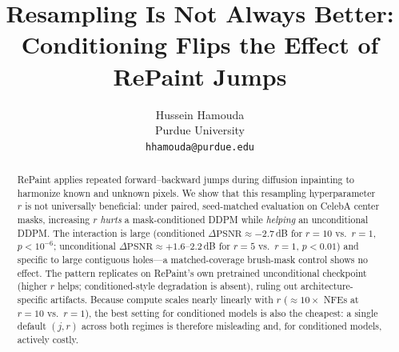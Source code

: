 \documentclass{article}
\title{Resampling Is Not Always Better:\\
Conditioning Flips the Effect of RePaint Jumps}
\author{%
  Hussein Hamouda \\
  Purdue University \\
  \texttt{hhamouda@purdue.edu} \\
}
\begin{document}
\maketitle

\begin{abstract}
RePaint applies repeated forward--backward jumps during diffusion inpainting to harmonize known and unknown pixels.
We show that this resampling hyperparameter $r$ is not universally beneficial:
under paired, seed-matched evaluation on CelebA center masks, increasing $r$ \emph{hurts} a mask-conditioned DDPM while \emph{helping} an unconditional DDPM.
The interaction is large (conditioned $\Delta\mathrm{PSNR}{\approx}{-}2.7$\,dB for $r{=}10$ vs.\ $r{=}1$, $p{<}10^{-6}$; unconditional $\Delta\mathrm{PSNR}{\approx}{+}1.6$--$2.2$\,dB for $r{=}5$ vs.\ $r{=}1$, $p{<}0.01$) and specific to large contiguous holes---a matched-coverage brush-mask control shows no effect.
The pattern replicates on RePaint's own pretrained unconditional checkpoint (higher $r$ helps; conditioned-style degradation is absent), ruling out architecture-specific artifacts.
Because compute scales nearly linearly with $r$ (${\approx}10{\times}$ NFEs at $r{=}10$ vs.\ $r{=}1$), the best setting for conditioned models is also the cheapest: a single default $(j,r)$ across both regimes is therefore misleading and, for conditioned models, actively costly.
\end{abstract}








{\small


}
\end{document}
